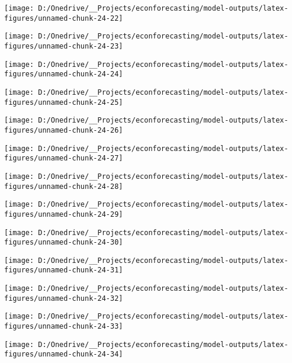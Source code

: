 \documentclass[11pt, letterpaper]{article}\usepackage[]{graphicx}\usepackage[]{color}
\begin{document}
{\centering \texttt{[image: D:/Onedrive/\_\_Projects/econforecasting/model-outputs/latex-figures/unnamed-chunk-24-22]} 

}




{\centering \texttt{[image: D:/Onedrive/\_\_Projects/econforecasting/model-outputs/latex-figures/unnamed-chunk-24-23]} 

}




{\centering \texttt{[image: D:/Onedrive/\_\_Projects/econforecasting/model-outputs/latex-figures/unnamed-chunk-24-24]} 

}




{\centering \texttt{[image: D:/Onedrive/\_\_Projects/econforecasting/model-outputs/latex-figures/unnamed-chunk-24-25]} 

}




{\centering \texttt{[image: D:/Onedrive/\_\_Projects/econforecasting/model-outputs/latex-figures/unnamed-chunk-24-26]} 

}




{\centering \texttt{[image: D:/Onedrive/\_\_Projects/econforecasting/model-outputs/latex-figures/unnamed-chunk-24-27]} 

}




{\centering \texttt{[image: D:/Onedrive/\_\_Projects/econforecasting/model-outputs/latex-figures/unnamed-chunk-24-28]} 

}




{\centering \texttt{[image: D:/Onedrive/\_\_Projects/econforecasting/model-outputs/latex-figures/unnamed-chunk-24-29]} 

}




{\centering \texttt{[image: D:/Onedrive/\_\_Projects/econforecasting/model-outputs/latex-figures/unnamed-chunk-24-30]} 

}




{\centering \texttt{[image: D:/Onedrive/\_\_Projects/econforecasting/model-outputs/latex-figures/unnamed-chunk-24-31]} 

}




{\centering \texttt{[image: D:/Onedrive/\_\_Projects/econforecasting/model-outputs/latex-figures/unnamed-chunk-24-32]} 

}




{\centering \texttt{[image: D:/Onedrive/\_\_Projects/econforecasting/model-outputs/latex-figures/unnamed-chunk-24-33]} 

}




{\centering \texttt{[image: D:/Onedrive/\_\_Projects/econforecasting/model-outputs/latex-figures/unnamed-chunk-24-34]} 

}
\end{document}
